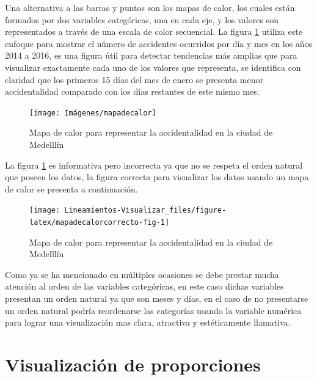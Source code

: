 \documentclass[
]{book}
\begin{document}
Una alternativa a las barras y puntos son los mapas de calor, los cuales están formados por dos variables categóricas, una en cada eje, y los valores son representados a través de una escala de color secuencial. La figura \ref{fig:mapadecalor-fig} utiliza este enfoque para mostrar el número de accidentes ocurridos por día y mes en los años 2014 a 2016, es una figura útil para detectar tendencias más amplias que para visualizar exactamente cada uno de los valores que representa, se identifica con claridad que los primeros 15 días del mes de enero se presenta menor accidentalidad comparado con los días restantes de este mismo mes.

\begin{figure}

{\centering \texttt{[image: Imágenes/mapadecalor]} 

}

\caption{Mapa de calor para representar la accidentalidad en la ciudad de Medelllín}\label{fig:mapadecalor-fig}
\end{figure}

La figura \ref{fig:mapadecalor-fig} es informativa pero incorrecta ya que no se respeta el orden natural que poseen los datos, la figura correcta para visualizar los datos usando un mapa de calor se presenta a continuación.

\begin{figure}

{\centering \texttt{[image: Lineamientos-Visualizar\_files/figure-latex/mapadecalorcorrecto-fig-1]} 

}

\caption{Mapa de calor para representar la accidentalidad en la ciudad de Medelllín}\label{fig:mapadecalorcorrecto-fig}
\end{figure}

Como ya se ha mencionado en múltiples ocasiones se debe prestar mucha atención al orden de las variables categóricas, en este caso dichas variables presentan un orden natural ya que son meses y días, en el caso de no presentarse un orden natural podría reordenarse las categorías usando la variable numérica para lograr una visualización mas clara, atractiva y estéticamente llamativa.

\hypertarget{visualizaciuxf3n-de-proporciones}{%
\section{Visualización de proporciones}\label{visualizaciuxf3n-de-proporciones}}
\end{document}
